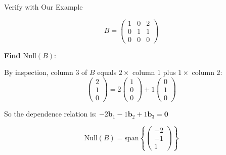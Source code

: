 \documentclass[10pt]{beamer}
\theoremstyle{definition}
\newcommand{\x}[1]{\alert{\textbf{#1}}}
\begin{document}
\begin{frame}{Verify with Our Example}

$$B = \begin{pmatrix} 1 & 0 & 2 \\ 0 & 1 & 1 \\ 0 & 0 & 0 \end{pmatrix}$$

\vspace{1em}

\x{Find $\text{Null}(B)$}:

By inspection, column 3 of $B$ equals $2 \times$ column 1 plus $1 \times$ column 2:
$$\begin{pmatrix} 2\\1\\0 \end{pmatrix} = 2\begin{pmatrix} 1\\0\\0 \end{pmatrix} + 1\begin{pmatrix} 0\\1\\0 \end{pmatrix}$$

So the dependence relation is: $-2\mathbf{b}_1 - 1\mathbf{b}_2 + 1\mathbf{b}_3 = \mathbf{0}$

$$\text{Null}(B) = \text{span}\left\{\begin{pmatrix} -2\\-1\\1 \end{pmatrix}\right\}$$

\end{frame}
\end{document}
